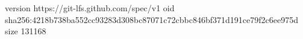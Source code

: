 version https://git-lfs.github.com/spec/v1
oid sha256:4218b738ba552cc93283d308bc87071c72cbbc846bf371d191ce79f2c6ee975d
size 131168
